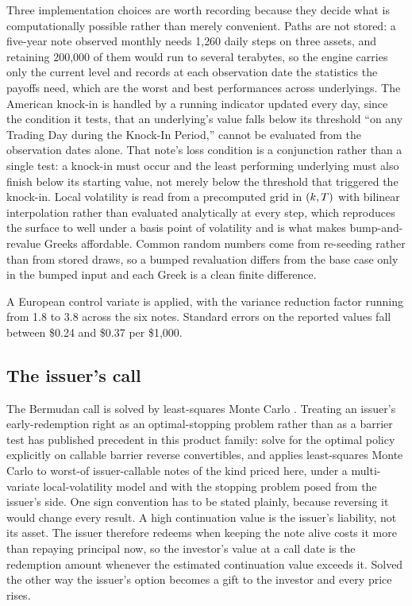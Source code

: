 Three implementation choices are worth recording because they decide what is
computationally possible rather than merely convenient. Paths are not stored: a
five-year note observed monthly needs 1{,}260 daily steps on three assets, and
retaining 200{,}000 of them would run to several terabytes, so the engine
carries only the current level and records at each observation date the
statistics the payoffs need, which are the worst and best performances across
underlyings. The American knock-in is handled by a running indicator updated
every day, since the condition it tests, that an underlying's value falls below
its threshold ``on any Trading Day during the Knock-In Period,'' cannot be
evaluated from the observation dates alone. That note's loss condition is a
conjunction rather than a single test: a knock-in must occur and the least
performing underlying must also finish below its starting value, not merely
below the threshold that triggered the knock-in. Local volatility is read from a precomputed grid in
$(k, T)$ with bilinear interpolation rather than evaluated analytically at
every step, which reproduces the surface to well under a basis point of
volatility and is what makes bump-and-revalue Greeks affordable. Common random
numbers come from re-seeding rather than from stored draws, so a bumped
revaluation differs from the base case only in the bumped input and each Greek
is a clean finite difference.

A European control variate is applied, with the variance reduction factor
running from 1.8 to 3.8 across the six notes. Standard errors on the reported
values fall between \$0.24 and \$0.37 per \$1{,}000.

\subsection{The issuer's call}

The Bermudan call is solved by least-squares Monte Carlo
\citep{LongstaffSchwartz2001}. Treating an issuer's early-redemption right as
an optimal-stopping problem rather than as a barrier test has published
precedent in this product family: \citet{Detemple2021} solve for the optimal
policy explicitly on callable barrier reverse convertibles, and
\citet{Huo2025} applies least-squares Monte Carlo to worst-of issuer-callable
notes of the kind priced here, under a multi-variate local-volatility model and
with the stopping problem posed from the issuer's side. One sign convention has
to be stated plainly, because reversing it would change every result. A high continuation
value is the issuer's liability, not its asset. The issuer therefore redeems
when keeping the note alive costs it more than repaying principal now, so the
investor's value at a call date is the redemption amount whenever the estimated
continuation value exceeds it. Solved the other way the issuer's option becomes
a gift to the investor and every price rises.

